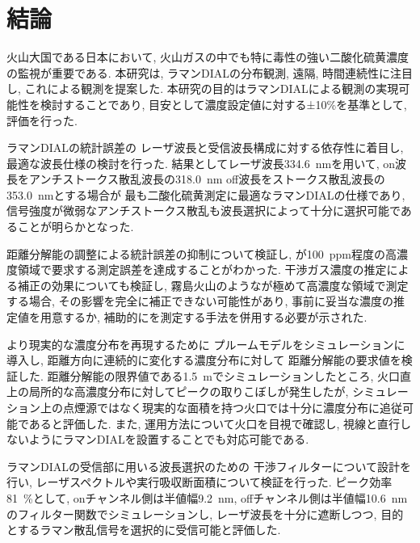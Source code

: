 \chapter[結論]{結論}\label{chapt6}
火山大国である日本において, 
火山ガスの中でも特に毒性の強い二酸化硫黄濃度の監視が重要である. 
本研究は, ラマンDIALの分布観測, 遠隔, 時間連続性に注目し, 
これによる観測を提案した. 
本研究の目的はラマンDIALによる観測の実現可能性を検討することであり, 
目安として濃度設定値に対する±10\%を基準として, 
評価を行った. 


ラマンDIALの統計誤差の
レーザ波長と受信波長構成に対する依存性に着目し, 
最適な波長仕様の検討を行った. 
結果としてレーザ波長\qty{334.6}{nm}を用いて, 
on波長をアンチストークス散乱波長の\qty{318.0}{nm} 
off波長をストークス散乱波長の\qty{353.0}{nm}とする場合が
最も二酸化硫黄測定に最適なラマンDIALの仕様であり, 
信号強度が微弱なアンチストークス散乱も波長選択によって十分に選択可能であることが明らかとなった. 


距離分解能の調整による統計誤差の抑制について検証し, 
が\qty{100}{ppm}程度の高濃度領域で要求する測定誤差を達成することがわかった.
干渉ガス濃度の推定による補正の効果についても検証し, 
霧島火山のようなが極めて高濃度な領域で測定する場合, 
その影響を完全に補正できない可能性があり, 
事前に妥当な濃度の推定値を用意するか, 
補助的にを測定する手法を併用する必要が示された. 


より現実的な濃度分布を再現するために
プルームモデルをシミュレーションに導入し, 
距離方向に連続的に変化する濃度分布に対して
距離分解能の要求値を検証した. 
距離分解能の限界値である\qty{1.5}{m}でシミュレーションしたところ, 
火口直上の局所的な高濃度分布に対してピークの取りこぼしが発生したが, 
シミュレーション上の点煙源ではなく現実的な面積を持つ火口では十分に濃度分布に追従可能であると評価した. 
また, 運用方法について火口を目視で確認し, 
視線と直行しないようにラマンDIALを設置することでも対応可能である. 


ラマンDIALの受信部に用いる波長選択のための
干渉フィルターについて設計を行い, 
レーザスペクトルや実行吸収断面積について検証を行った. 
ピーク効率\qty{81}{\%}として, 
onチャンネル側は半値幅\qty{9.2}{nm}, 
offチャンネル側は半値幅\qty{10.6}{nm}のフィルター関数でシミュレーションし,  
レーザ波長を十分に遮断しつつ,
目的とするラマン散乱信号を選択的に受信可能と評価した. 
